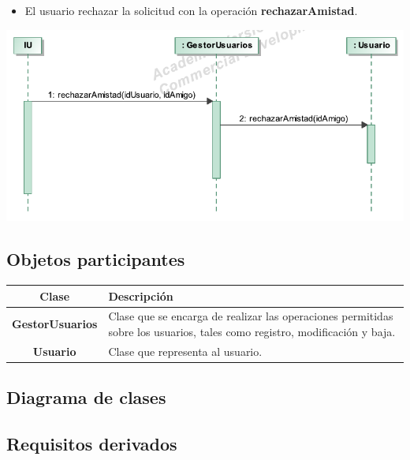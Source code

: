 \documentclass[12pt, a4paper, titlepage]{article}
\begin{document}
\begin{itemize}
	\item El usuario rechazar la solicitud con la operación \textbf{rechazarAmistad}.
\end{itemize}

\begin{center}
	\includegraphics{Imagenes/OperacionRechazarAmistad}
\end{center}

\subsection{Objetos participantes}
\begin{center}

\begin{tabular}{|c|p{14cm}|}
	\hline
	\textbf{Clase} & \textbf{Descripción}\\ \hline
	\textbf{GestorUsuarios} &  Clase que se encarga de realizar las operaciones permitidas sobre los usuarios, tales como registro, modificación y baja.\\ \hline
	\textbf{Usuario} & Clase que representa al usuario. \\ \hline
\end{tabular}

\end{center}


\subsection{Diagrama de clases}

\subsection{Requisitos derivados}
\end{document}
